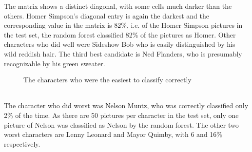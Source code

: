 \documentclass[journal, a4paper]{IEEEtran}
\begin{document}
The matrix shows a distinct diagonal, with some cells much darker than the others. Homer Simpson's diagonal entry is again the darkest and the corresponding value in the matrix is 82\%, i.e. of the Homer Simpson pictures in the test set, the random forest classified 82\% of the pictures as Homer. Other characters who did well were Sideshow Bob who is easily distinguished by his wild reddish hair. The third best candidate is Ned Flanders, who is presumably recognizable by his green sweater. 
\begin{figure}
\hfill
{}\hfill
{}
\caption{The characters who were the easiest to classify correctly}
\end{figure}
\\
The character who did worst was Nelson Muntz, who was correctly classified only 2\% of the time. As there are 50 pictures per character in the test set, only one picture of Nelson was classified as Nelson by the random forest. The other two worst characters are Lenny Leonard and Mayor Quimby, with 6 and 16\% respectively. 
\end{document}
